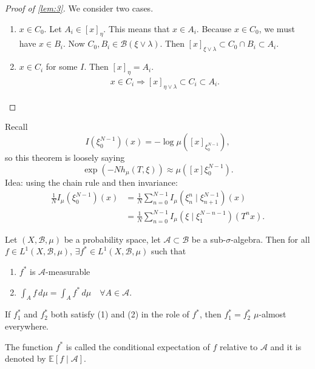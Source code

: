 \documentclass{article}
\begin{document}
\begin{proof}[Proof of \cref{lem:3}]
  We consider two cases.
  \begin{enumerate}
    \item $x \in C_0$. Let $A_i \in [x]_\eta$.
      This means that $x \in A_i$. Because $x \in C_0$, we must have $x \in B_i$.
      Now $C_0, B_i \in \mathcal{B}(\xi \vee \lambda)$.
      Then $[x]_{\xi \vee \lambda} \subset C_0 \cap B_i \subset A_i$.
    \item $x \in C_i$ for some $I$.
    Then $[x]_\eta = A_i$.
    \begin{align*}
      x \in C_i \Rightarrow [x]_{\eta \vee \lambda} \subset C_i \subset A_i.
    \end{align*} \qedhere
  \end{enumerate}
\end{proof}
\color{black}

Recall
\begin{equation*}
  I(\xi_0^{N-1})(x) = -\log \mu([x]_{\xi_0^{N-1}}),
\end{equation*}
so this theorem is loosely saying
\begin{equation*}
  \exp(-N h_\mu(T,\xi)) \approx \mu([x]\xi_0^{N-1}).
\end{equation*}
Idea: using the chain rule and then invariance:
\begin{align*}
  \frac{1}{N} I_\mu(\xi_0^{N-1})(x) &= \frac{1}{N} \sum_{n=0}^{N-1} I_\mu(\xi_n^n \mid \xi_{n+1}^{N-1})(x) \\
                                    &= \frac{1}{N} \sum_{n=0}^{N-1} I_\mu(\xi \mid \xi_1^{N-n-1})(T^n x).
\end{align*}
\begin{defi}
  Let $(X,\mathcal{B},\mu)$ be a probability space, let $\mathcal{A} \subset \mathcal{B}$ be a sub-$\sigma$-algebra.
  Then for all $f \in L^1(X, \mathcal{B}, \mu)$, $\exists f^* \in L^1(X, \mathcal{B},\mu)$ such that
  \begin{enumerate}[label=(\arabic*)]
    \item $f^*$ is $\mathcal{A}$-measurable
    \item $\int_A f \, d\mu = \int_A f^* \, d\mu \quad \forall A \in \mathcal{A}$.
  \end{enumerate}

  If $f_1^*$ and $f_2^*$ both satisfy (1) and (2) in the role of $f^*$, then $f_1^* = f_2^*$ $\mu$-almost everywhere.

  The function $f^*$ is called the conditional expectation of $f$ relative to $\mathcal{A}$ and it is denoted by $\mathbb{E}[f \mid \mathcal{A}]$.
\end{defi}
\end{document}
